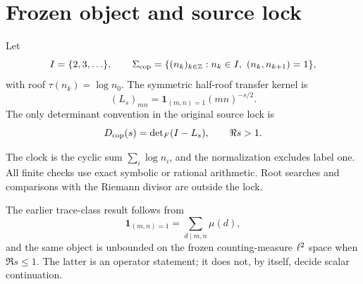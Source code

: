 \section{Frozen object and source lock}

Let
\[
 I=\{2,3,\ldots\},\qquad
 \Sigma_{\mathrm{cop}}=\{(n_k)_{k\in\mathbb Z}:n_k\in I,
                    \ (n_k,n_{k+1})=1\},
\]
with roof \(\tau(n_k)=\log n_0\).  The symmetric half-roof transfer kernel
is
\[
 (L_s)_{mn}=\mathbf 1_{(m,n)=1}(mn)^{-s/2}.
\]
The only determinant convention in the original source lock is
\[
 D_{\mathrm{cop}}(s)=\operatorname{det}_{F}(I-L_s),\qquad \Re s>1.
\]

The clock is the cyclic sum \(\sum_i\log n_i\), and the normalization
excludes label one.  All finite checks use exact symbolic or rational
arithmetic.  Root searches and comparisons with the Riemann divisor are
outside the lock.

The earlier trace-class result follows from
\[
 \mathbf 1_{(m,n)=1}=\sum_{d\mid m,n}\mu(d),
\]
and the same object is unbounded on the frozen counting-measure \(\ell^2\)
space when \(\Re s\le1\).  The latter is an operator statement; it does not,
by itself, decide scalar continuation.
